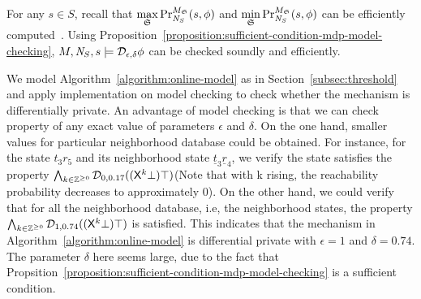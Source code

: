 For any $s \in S$, recall that $\max\limits_{\scheduler{S}}
\myPr{s}{M_{\scheduler{S}}}{\neighbor{S}}{\phi}$ and
$\min\limits_{\scheduler{S}}
\myPr{s}{M_{\scheduler{S}}}{\neighbor{S}}{\phi}$ can be efficiently 
computed~\cite{BK:08:PMC}. 
Using
Proposition~\ref{proposition:sufficient-condition-mdp-model-checking},
$M, \neighbor{S}, s \models \dpriv{\epsilon}{\delta} \phi$ can be
checked soundly and efficiently.

We model Algorithm~\ref{algorithm:online-model} as in Section~\ref{subsec:threshold} 
and apply implementation on model checking to check whether the
mechanism is differentially private. An advantage of model checking is that we
can check property of any exact value of parameters $\epsilon$ and $\delta$.
On the one hand,
smaller values for particular neighborhood database could be obtained.
For instance, for the state $t_3r_5$ and its neighborhood state $\underline{t}_3\underline{r}_4$, we verify the state
satisfies the property $\bigwedge_{k \in \bbfZ^{\geq 0}} \dpriv{0}{0.17} ((\X^k\bot) \top)$(Note that with k rising, the reachability probability decreases to approximately 0).
On the other hand, we could verify that for all the neighborhood database, i.e, the neighborhood states, the property $\bigwedge_{k \in \bbfZ^{\geq 0}} \dpriv{1}{0.74} ((\X^k\bot) \top)$ is satisfied. This indicates that the mechanism in Algorithm~\ref{algorithm:online-model} is differential private with $\epsilon = 1$ and $\delta = 0.74$. The parameter $\delta$ here seems large, due to the fact that 
Propsition~\ref{proposition:sufficient-condition-mdp-model-checking} is a sufficient 
condition.





